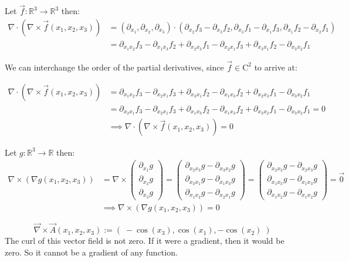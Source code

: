 \documentclass[11pt]{article}
\begin{document}
\begin{solution}
Let $\vec{f} \colon \mathbb{R}^3 \to \mathbb{R}^3$ then:
\begin{align*}
     \nabla \cdot (\nabla \times \vec{f}(x_1,x_2,x_3)) &= (\partial_{x_1}, \partial_{x_2}, \partial_{x_3}) \cdot (\partial _{x_2} f_3 - \partial _{x_3} f_2,\partial _{x_3} f_1 - \partial _{x_1} f_3,\partial _{x_1} f_2 - \partial _{x_2} f_1)  \\
 &=  \partial_{x_1 x_2}f_3 - \partial_{x_1 x_3}f_2 + \partial _{x_2 x_3} f_1 - \partial _{x_2 x_1} f_3 + \partial _{x_3 x_1} f_2 - \partial _{x_3 x_2} f_1
\end{align*}

We can interchange the order of the partial derivatives, since $\vec{f} \in \mathrm{C}^2$ to arrive at:

\begin{align*}
 \nabla \cdot (\nabla \times \vec{f}(x_1,x_2,x_3)) &=	 \partial_{x_1 x_2}f_3 - \partial _{x_2 x_1} f_3 + \partial _{x_3 x_1} f_2 - \partial_{x_1 x_3}f_2 + \partial _{x_2 x_3} f_1  - \partial _{x_3 x_2} f_1\\
&=	 \partial_{x_2 x_1}f_3 - \partial _{x_2 x_1} f_3 + \partial _{x_1 x_3} f_2 - \partial_{x_1 x_3}f_2 + \partial _{x_3 x_2} f_1  - \partial _{x_3 x_2} f_1 = 0\\
&\implies  \nabla \cdot (\nabla \times \vec{f}(x_1,x_2,x_3)) =0
\end{align*}

Let  $g \colon \mathbb{R}^3 \to \mathbb{R}$ then: 
\begin{align*}
	\nabla \times (\nabla g(x_1,x_2,x_3)) &= \nabla \times \begin{pmatrix}\partial_{x_1} g \\ \partial_{x_2} g \\ \partial_{x_3} g \end{pmatrix} = \begin{pmatrix} \partial_{x_2x_3} g - \partial_{x_3x_2} g \\ \partial_{x_3x_1} g - \partial_{x_1x_3} g \\ \partial_{x_1x_2} g - \partial_{x_2x_1} g \end{pmatrix} = \begin{pmatrix} \partial_{x_2x_3} g - \partial_{x_2x_3} g \\ \partial_{x_1x_3} g - \partial_{x_1x_3} g \\ \partial_{x_1x_2} g - \partial_{x_1x_2} g \end{pmatrix} = \vec{0}\\
&\implies \nabla \times (\nabla g(x_1,x_2,x_3))  = 0
\end{align*}

    \[
        \vec{\nabla} \times \vec{A}(x_1,x_2,x_3)
        :=
        \left(\;
            -\cos(x_3),  \cos(x_1), -\cos(x_2)
        \;\right)
    \]
    The curl of this vector field is not zero. 
    If it were a gradient, then it would be zero. 
    So it cannot be a gradient of any function.
     
\end{solution}
\end{document}

